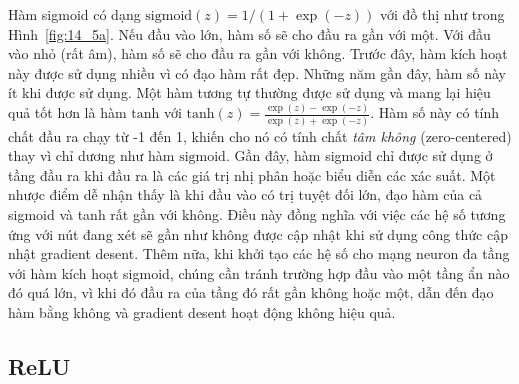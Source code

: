 


Hàm sigmoid có dạng $\text{sigmoid}(z) = 1/(1 + \exp(-z))$ với đồ thị như
trong
Hình~\ref{fig:14_5a}. Nếu đầu vào lớn, hàm số sẽ cho đầu ra gần với một. Với đầu
vào nhỏ (rất âm), hàm số sẽ cho đầu ra gần với không. Trước đây, hàm kích hoạt này
được sử dụng nhiều vì có đạo hàm rất đẹp. Những năm gần đây, hàm số
này ít khi được sử dụng. Một hàm tương tự thường được sử dụng và mang lại hiệu
quả tốt hơn là hàm $\text{tanh}$ với $\displaystyle \text{tanh}(z) =
\frac{\exp(z) -
\exp{(-z)}}{\exp(z) + \exp(-z)}$. Hàm số
này có tính chất đầu ra chạy từ -1 đến 1, khiến cho nó có tính chất \textit{tâm không} (zero-centered) thay vì chỉ dương như hàm $\text{sigmoid}$. Gần đây, hàm sigmoid
chỉ được sử dụng ở tầng đầu ra khi đầu ra là các giá trị nhị phân hoặc biểu diễn các xác suất.
Một nhược điểm dễ nhận thấy là khi đầu vào có trị tuyệt đối lớn, đạo hàm của cả sigmoid và tanh rất gần với không. Điều này đồng nghĩa với
việc các hệ số tương ứng với nút đang xét sẽ gần như không được cập nhật khi sử
dụng công thức cập nhật gradient desent. Thêm nữa, khi khởi tạo các hệ số cho
mạng neuron đa tầng với hàm kích hoạt sigmoid, chúng cần tránh trường
hợp đầu vào một tầng ẩn nào đó quá lớn, vì khi đó đầu ra của tầng đó rất gần không hoặc một, dẫn đến đạo hàm bằng không và gradient desent hoạt động
không hiệu quả.




\subsection{ReLU}


